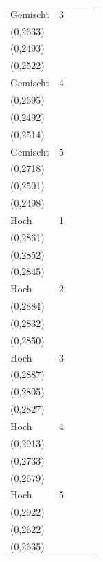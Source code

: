 {\begin{tabular}{llccc}
Gemischt & 3 & \shortstack{$0{,}1994 \pm 0{,}0308$\\(0{,}2633)} & \shortstack{$0{,}2330 \pm 0{,}0243$\\(0{,}2493)} & \shortstack{$0{,}2303 \pm 0{,}0217$\\(0{,}2522)} \\
Gemischt & 4 & \shortstack{$0{,}1771 \pm 0{,}0399$\\(0{,}2695)} & \shortstack{$0{,}2288 \pm 0{,}0250$\\(0{,}2492)} & \shortstack{$0{,}2271 \pm 0{,}0278$\\(0{,}2514)} \\
Gemischt & 5 & \shortstack{$0{,}1695 \pm 0{,}0435$\\(0{,}2718)} & \shortstack{$0{,}2259 \pm 0{,}0253$\\(0{,}2501)} & \shortstack{$0{,}2289 \pm 0{,}0293$\\(0{,}2498)} \\
Hoch & 1 & \shortstack{$0{,}2486 \pm 0{,}0187$\\(0{,}2861)} & \shortstack{$0{,}2266 \pm 0{,}0173$\\(0{,}2852)} & \shortstack{$0{,}2322 \pm 0{,}0186$\\(0{,}2845)} \\
Hoch & 2 & \shortstack{$0{,}1862 \pm 0{,}0280$\\(0{,}2884)} & \shortstack{$0{,}2281 \pm 0{,}0185$\\(0{,}2832)} & \shortstack{$0{,}2235 \pm 0{,}0153$\\(0{,}2850)} \\
Hoch & 3 & \shortstack{$0{,}1546 \pm 0{,}0385$\\(0{,}2887)} & \shortstack{$0{,}2195 \pm 0{,}0170$\\(0{,}2805)} & \shortstack{$0{,}2162 \pm 0{,}0193$\\(0{,}2827)} \\
Hoch & 4 & \shortstack{$0{,}1272 \pm 0{,}0418$\\(0{,}2913)} & \shortstack{$0{,}1979 \pm 0{,}0374$\\(0{,}2733)} & \shortstack{$0{,}2065 \pm 0{,}0423$\\(0{,}2679)} \\
Hoch & 5 & \shortstack{$0{,}1193 \pm 0{,}0461$\\(0{,}2922)} & \shortstack{$0{,}2269 \pm 0{,}0763_{n=89}$\\(0{,}2622)} & \shortstack{$0{,}1981 \pm 0{,}0785_{n=96}$\\(0{,}2635)} \\

\end{tabular}}
